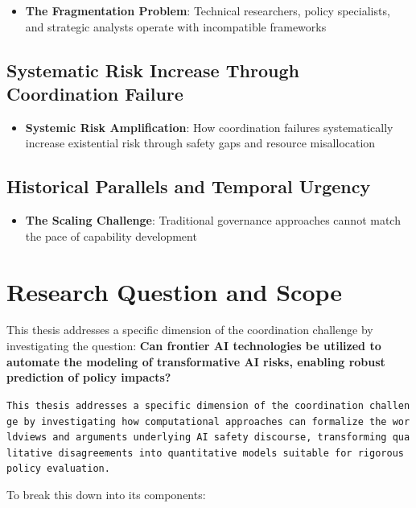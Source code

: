 \documentclass[
  11pt,
  letterpaper,
]{book}
\providecommand{\tightlist}{%
  \setlength{\itemsep}{0pt}\setlength{\parskip}{0pt}}
\begin{document}
\begin{itemize}
\tightlist
\item
  \textbf{The Fragmentation Problem}: Technical researchers, policy
  specialists, and strategic analysts operate with incompatible
  frameworks
\end{itemize}

\subsection{Systematic Risk Increase Through Coordination
Failure}\label{sec-risk-increase}

\begin{itemize}
\tightlist
\item
  \textbf{Systemic Risk Amplification}: How coordination failures
  systematically increase existential risk through safety gaps and
  resource misallocation
\end{itemize}

\subsection{Historical Parallels and Temporal
Urgency}\label{sec-historical-parallels}

\begin{itemize}
\tightlist
\item
  \textbf{The Scaling Challenge}: Traditional governance approaches
  cannot match the pace of capability development
\end{itemize}

\section{Research Question and Scope}\label{sec-research-question}

This thesis addresses a specific dimension of the coordination challenge
by investigating the question: \textbf{Can frontier AI technologies be
utilized to automate the modeling of transformative AI risks, enabling
robust prediction of policy impacts?}

\texttt{This\ thesis\ addresses\ a\ specific\ dimension\ of\ the\ coordination\ challenge\ by\ investigating\ how\ computational\ approaches\ can\ formalize\ the\ worldviews\ and\ arguments\ underlying\ AI\ safety\ discourse,\ transforming\ qualitative\ disagreements\ into\ quantitative\ models\ suitable\ for\ rigorous\ policy\ evaluation.}

To break this down into its components:
\end{document}
